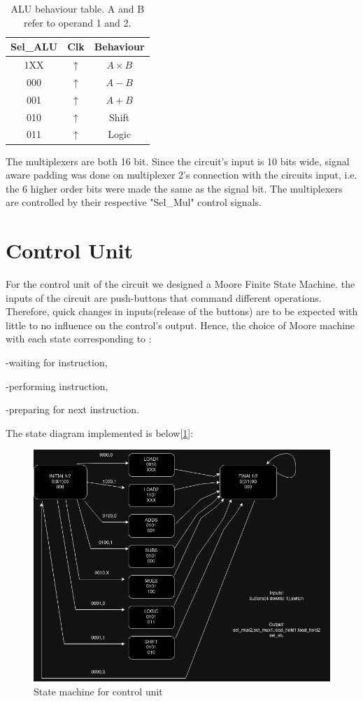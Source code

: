\documentclass[12pt]{article}
\begin{document}
\begin{table}[H]
	\center
	\begin{tabular}{|c|c|c|}
		\hline
		Sel\_ALU & Clk        & Behaviour       \\
		\hline
		1XX     & $\uparrow$ & $A \times B$ \\
		000     & $\uparrow$ & $A-B$        \\
		001     & $\uparrow$ & $A+B$        \\
		010     & $\uparrow$ & Shift        \\
		011     & $\uparrow$ & Logic        \\
		\hline
	\end{tabular}
	\caption{ALU behaviour table. A and B refer to operand 1 and 2.}
	\label{tab:ALU}
\end{table}

The multiplexers are both 16 bit. Since the circuit's input is 10 bits wide, signal aware padding was done on multiplexer 2's connection with the circuits input, i.e. the 6 higher order bits were made the same as the signal bit.
The multiplexers are controlled by their respective "Sel\_Mul" control signals.


\section{Control Unit}
For the control unit of the circuit we designed a Moore Finite State Machine.
the inputs of the circuit are push-buttons that command different operations. Therefore, quick changes in inputs(release of the buttons) are to be expected with little to no influence on the control's output. Hence, the choice of Moore machine with each state corresponding to :

-waiting for instruction, 

-performing instruction,

-preparing for next instruction.

The state diagram implemented is below[\ref{fig:FSM}]:
\begin{figure}[H]
	\centering
	\includegraphics[width=0.55\linewidth]{Imagens/state_machine_lab1.jpg}
	\caption{State machine for control unit}
	\label{fig:FSM}
\end{figure}
\end{document}
